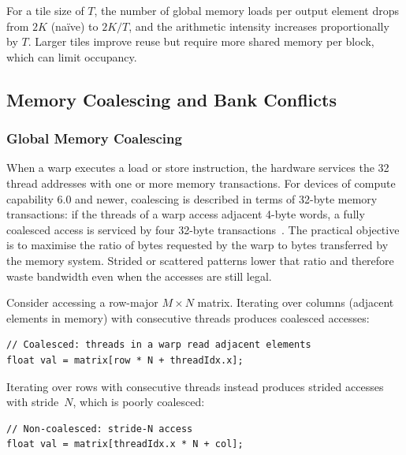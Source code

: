 For a tile size of $T$, the number of global memory loads per output element drops from $2K$ (na\"ive) to $2K/T$, and the arithmetic intensity increases proportionally by $T$. Larger tiles improve reuse but require more shared memory per block, which can limit occupancy.

\subsection{Memory Coalescing and Bank Conflicts}\label{sec:coalescing}

\subsubsection{Global Memory Coalescing}

When a warp executes a load or store instruction, the hardware services the 32
thread addresses with one or more memory transactions. For devices of compute
capability 6.0 and newer, coalescing is described in terms of 32-byte memory
transactions: if the threads of a warp access adjacent 4-byte words, a fully
coalesced access is serviced by four 32-byte transactions~\cite{nvidia-cuda-best-practices,nvidia-cuda-guide}. The practical objective is to maximise the ratio of bytes requested by the warp to bytes transferred by the memory system. Strided or scattered patterns lower that ratio and therefore waste bandwidth even when the accesses are still legal.

Consider accessing a row-major $M \times N$ matrix. Iterating over columns (adjacent elements in memory) with consecutive threads produces coalesced accesses:

\begin{lstlisting}[language=CUDA, caption={Coalesced access pattern: consecutive threads read consecutive columns.}, label={lst:coalesced}]
// Coalesced: threads in a warp read adjacent elements
float val = matrix[row * N + threadIdx.x];
\end{lstlisting}

Iterating over rows with consecutive threads instead produces strided accesses with stride~$N$, which is poorly coalesced:

\begin{lstlisting}[language=CUDA, caption={Non-coalesced access pattern: consecutive threads read elements separated by stride $N$.}, label={lst:non-coalesced}]
// Non-coalesced: stride-N access
float val = matrix[threadIdx.x * N + col];
\end{lstlisting}

